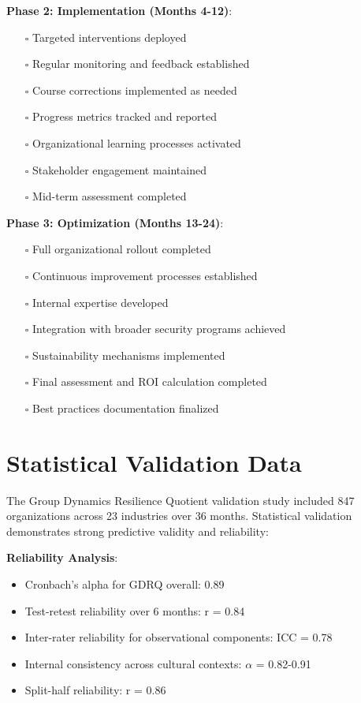 \documentclass[11pt,a4paper]{article}
\begin{document}
\textbf{Phase 2: Implementation (Months 4-12)}:
\begin{itemize}
\item[$\square$] Targeted interventions deployed
\item[$\square$] Regular monitoring and feedback established
\item[$\square$] Course corrections implemented as needed
\item[$\square$] Progress metrics tracked and reported
\item[$\square$] Organizational learning processes activated
\item[$\square$] Stakeholder engagement maintained
\item[$\square$] Mid-term assessment completed
\end{itemize}

\textbf{Phase 3: Optimization (Months 13-24)}:
\begin{itemize}
\item[$\square$] Full organizational rollout completed
\item[$\square$] Continuous improvement processes established
\item[$\square$] Internal expertise developed
\item[$\square$] Integration with broader security programs achieved
\item[$\square$] Sustainability mechanisms implemented
\item[$\square$] Final assessment and ROI calculation completed
\item[$\square$] Best practices documentation finalized
\end{itemize}

\section{Statistical Validation Data}
\label{app:validation_data}

The Group Dynamics Resilience Quotient validation study included 847 organizations across 23 industries over 36 months. Statistical validation demonstrates strong predictive validity and reliability:

\textbf{Reliability Analysis}:
\begin{itemize}
\item Cronbach's alpha for GDRQ overall: 0.89
\item Test-retest reliability over 6 months: r = 0.84
\item Inter-rater reliability for observational components: ICC = 0.78
\item Internal consistency across cultural contexts: $\alpha$ = 0.82-0.91
\item Split-half reliability: r = 0.86
\end{itemize}
\end{document}
